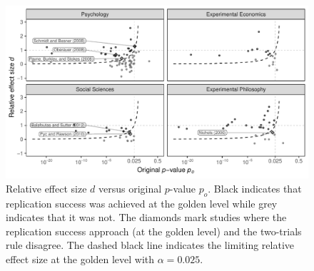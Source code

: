 \begin{figure}[!h]
\centering
\begin{knitrout}
\color{fgcolor}

{\centering \includegraphics[width=\maxwidth]{images/paper1/fig6-1}

}


\end{knitrout}
\caption{Relative effect size $d$ versus original $p$-value $p_o$. Black
  indicates that replication success was achieved at the golden level while grey
  indicates that it was not. The diamonds mark studies where the replication
  success approach (at the golden level) and the two-trials rule disagree. The
  dashed black line indicates the limiting relative effect size at the golden
  level with $\alpha = 0.025$. }
\label{fig1:fig6}
\end{figure}


